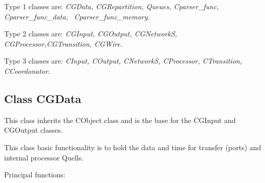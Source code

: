 \documentclass[a4paper,oneside,notitlepage]{article}
\begin{document}
Type 1 classes are: \textit{CGData, CGRepartition, Queues, Cparser\_func,
Cparser\_func\_data, }\linebreak \textit{\ Cparser\_func\_memory.}

Type 2 classes are: \textit{CGInput, CGOutput, CGNetworkS,
CGProcessor,CGTransition, CGWire.}

Type 3 classes are: \textit{CInput, COutput, CNetworkS, CProcessor,
CTransition, CCoordonator}.

\subsection{Class CGData}

This class inherits the CObject class and is the base for the CGInput and
CGOutput classes.

This class basic functionality is to hold the data and time for transfer
(ports) and internal processor Quells.

Principal functions:
\end{document}
